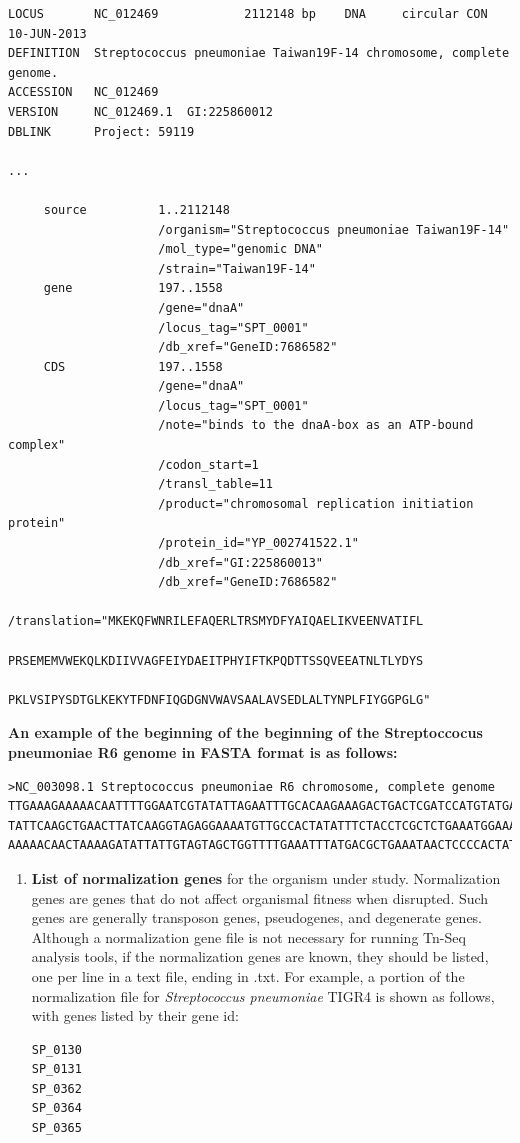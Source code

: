 \documentclass[11pt,]{article}
\begin{document}
\begin{verbatim}
LOCUS       NC_012469            2112148 bp    DNA     circular CON 10-JUN-2013
DEFINITION  Streptococcus pneumoniae Taiwan19F-14 chromosome, complete genome.
ACCESSION   NC_012469
VERSION     NC_012469.1  GI:225860012
DBLINK      Project: 59119

...

     source          1..2112148
                     /organism="Streptococcus pneumoniae Taiwan19F-14"
                     /mol_type="genomic DNA"
                     /strain="Taiwan19F-14"
     gene            197..1558
                     /gene="dnaA"
                     /locus_tag="SPT_0001"
                     /db_xref="GeneID:7686582"
     CDS             197..1558
                     /gene="dnaA"
                     /locus_tag="SPT_0001"
                     /note="binds to the dnaA-box as an ATP-bound complex"
                     /codon_start=1
                     /transl_table=11
                     /product="chromosomal replication initiation protein"
                     /protein_id="YP_002741522.1"
                     /db_xref="GI:225860013"
                     /db_xref="GeneID:7686582"
                     /translation="MKEKQFWNRILEFAQERLTRSMYDFYAIQAELIKVEENVATIFL
                     PRSEMEMVWEKQLKDIIVVAGFEIYDAEITPHYIFTKPQDTTSSQVEEATNLTLYDYS
                     PKLVSIPYSDTGLKEKYTFDNFIQGDGNVWAVSAALAVSEDLALTYNPLFIYGGPGLG"
\end{verbatim}

\textbf{An example of the beginning of the beginning of the
Streptoccocus pneumoniae R6 genome in FASTA format is as follows:}

\begin{verbatim}
>NC_003098.1 Streptococcus pneumoniae R6 chromosome, complete genome
TTGAAAGAAAAACAATTTTGGAATCGTATATTAGAATTTGCACAAGAAAGACTGACTCGATCCATGTATGATTTCTATGC
TATTCAAGCTGAACTTATCAAGGTAGAGGAAAATGTTGCCACTATATTTCTACCTCGCTCTGAAATGGAAATGGTCTGGG
AAAAACAACTAAAAGATATTATTGTAGTAGCTGGTTTTGAAATTTATGACGCTGAAATAACTCCCCACTATATTTTCACC
\end{verbatim}

\begin{enumerate}
\def\labelenumi{\arabic{enumi}.}
\setcounter{enumi}{5}
\item
  \textbf{List of normalization genes} for the organism under study.
  Normalization genes are genes that do not affect organismal fitness
  when disrupted. Such genes are generally transposon genes,
  pseudogenes, and degenerate genes. Although a normalization gene file
  is not necessary for running Tn-Seq analysis tools, if the
  normalization genes are known, they should be listed, one per line in
  a text file, ending in .txt. For example, a portion of the
  normalization file for \emph{Streptococcus pneumoniae} TIGR4 is shown
  as follows, with genes listed by their gene id:

\begin{verbatim}
SP_0130
SP_0131
SP_0362
SP_0364
SP_0365
\end{verbatim}
\end{enumerate}
\end{document}

